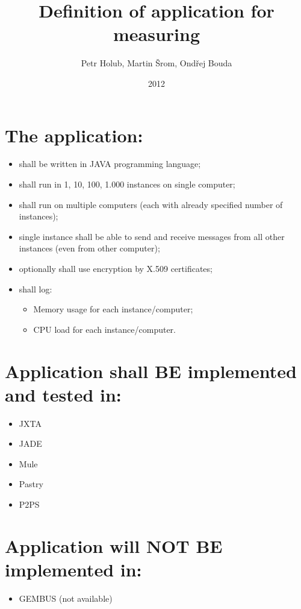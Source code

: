\documentclass[a4paper]{article}
\title{Definition of application for measuring}
\author{Petr Holub, Martin Šrom, Ondřej Bouda}
\date{2012}
\begin{document}
\maketitle

\section{The application:}
\begin{itemize}
\item shall be written in \textsc{JAVA} programming language;
\item shall run in 1, 10, 100, 1.000 instances on single computer;
\item shall run on multiple computers (each with already specified number of instances);
\item single instance shall be able to send and receive messages from all other instances (even from other computer);
\item optionally shall use encryption by \textsc{X.509} certificates;
\item shall log:
  \begin{itemize}
  \item Memory usage for each instance/computer;
  \item CPU load for each instance/computer.
  \end{itemize}
\end{itemize}

\section{Application shall BE implemented and tested in:}
\begin{itemize}
\item{JXTA}
\item{JADE}
\item{Mule}
\item{Pastry}
\item{P2PS}
\end{itemize}

\section{Application will NOT BE implemented in:}
\begin{itemize}
\item{GEMBUS} (not available)
\end{itemize}
\end{document}
